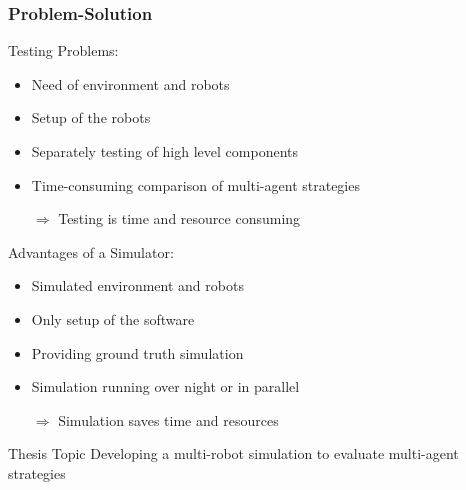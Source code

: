 \documentclass[]{beamer}
\begin{document}
\begin{frame}
\frametitle{Problem-Solution}
\begin{multicols}{2}
Testing Problems:
\begin{itemize}
\item Need of environment and robots 
\item Setup of the robots  %
\item Separately testing of high level components
\item Time-consuming comparison of multi-agent strategies
\pause
\item[$\Rightarrow$] Testing is time and resource consuming
\end{itemize}
\pause
Advantages of a Simulator:
\begin{itemize}
\item Simulated environment and robots
\item Only setup of the software
\item Providing ground truth simulation
\item Simulation running over night or in parallel
\pause
\item[$\Rightarrow$] Simulation saves time and resources
\end{itemize}
\end{multicols}
\pause
\begin{block}{Thesis Topic}
Developing a multi-robot simulation to evaluate multi-agent strategies
\end{block}
\end{frame}
\end{document}
